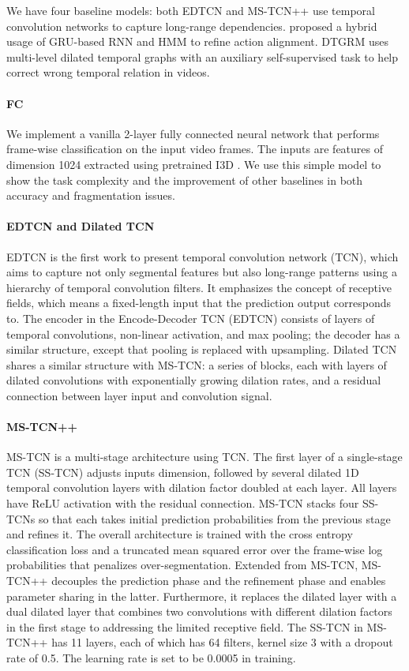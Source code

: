 We have four baseline models: both EDTCN \cite{8099596} and MS-TCN++ \cite{9186840} use temporal convolution networks to capture long-range dependencies.  proposed a hybrid usage of GRU-based RNN and HMM to refine action alignment. DTGRM \cite{wang2020temporal} uses multi-level dilated temporal graphs with an auxiliary self-supervised task to help correct wrong temporal relation in videos.

\paragraph{FC}
We implement a vanilla 2-layer fully connected neural network that performs frame-wise classification on the input video frames. The inputs are features of dimension 1024 extracted using pretrained I3D \cite{8099985}. We use this simple model to show the task complexity and the improvement of other baselines in both accuracy and fragmentation issues.

\paragraph{EDTCN and Dilated TCN}
EDTCN \cite{8099596} is the first work to present temporal convolution network (TCN), which aims to capture not only segmental features but also long-range patterns using a hierarchy of temporal convolution filters. It emphasizes the concept of receptive fields, which means a fixed-length input that the prediction output corresponds to. The encoder in the Encode-Decoder TCN (EDTCN) consists of layers of temporal convolutions, non-linear activation, and max pooling; the decoder has a similar structure, except that pooling is replaced with upsampling. Dilated TCN shares a similar structure with MS-TCN: a series of blocks, each with layers of dilated convolutions with exponentially growing dilation rates, and a residual connection between layer input and convolution signal.

\paragraph{MS-TCN++}
MS-TCN \cite{8953830} is a multi-stage architecture using TCN. The first layer of a single-stage TCN (SS-TCN) adjusts inputs dimension, followed by several dilated 1D temporal convolution layers with dilation factor doubled at each layer. All layers have ReLU activation with the residual connection. MS-TCN stacks four SS-TCNs so that each takes initial prediction probabilities from the previous stage and refines it. The overall architecture is trained with the cross entropy classification loss and a truncated mean squared error over the frame-wise log probabilities that penalizes over-segmentation. Extended from MS-TCN, MS-TCN++ \cite{9186840} decouples the prediction phase and the refinement phase and enables parameter sharing in the latter. Furthermore, it replaces the dilated layer with a dual dilated layer that combines two convolutions with different dilation factors in the first stage to addressing the limited receptive field. The SS-TCN in MS-TCN++ has 11 layers, each of which has 64 filters, kernel size 3 with a dropout rate of 0.5. The learning rate is set to be 0.0005 in training.


